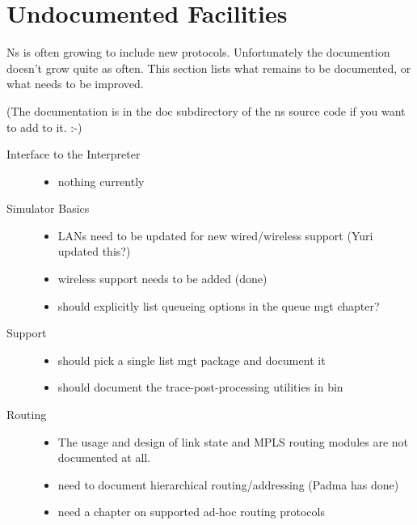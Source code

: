 
\chapter{Undocumented Facilities}

Ns is often growing to include new protocols.
Unfortunately the documention doesn't grow quite as often.
This section lists what remains to be documented,
  or what needs to be improved.

(The documentation is in the doc subdirectory of the ns source code
  if you want to add to it. :-)

\begin{description}
\item[Interface to the Interpreter]

        \begin{itemize}
        \item nothing currently
        \end{itemize}

\item[Simulator Basics]

        \begin{itemize}
        \item LANs need to be updated for new wired/wireless support
                (Yuri updated this?)
        \item wireless support needs to be added
                (done)
        \item should explicitly list queueing options in the queue mgt chapter?
        \end{itemize}

\item[Support]

        \begin{itemize}
        \item should pick a single list mgt package and document it
        \item should document the trace-post-processing utilities in bin
        \end{itemize}

\item[Routing]

  \begin{itemize}
  \item The usage and design of link state and MPLS routing modules
    are not documented at all.
  \item need to document hierarchical routing/addressing
    (Padma has done)
  \item need a chapter on supported ad-hoc routing protocols
  \end{itemize}
  

\end{description}
